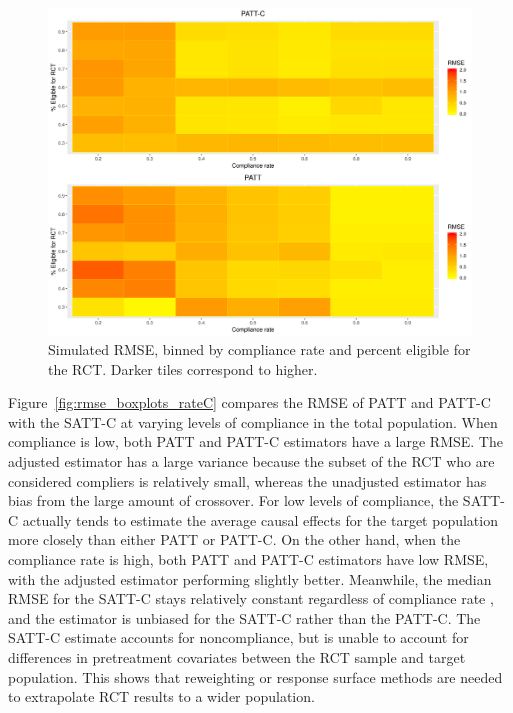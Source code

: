 \documentclass[hidelinks,12pt]{article}
\begin{document}
{\begin{figure}[htbp]
	\begin{center}
		\includegraphics[width = 1\textwidth]{rmse_ratec_rates}
		\caption{Simulated RMSE, binned by compliance rate and percent eligible for the RCT. Darker tiles correspond to higher.\label{fig:rmse_ratec_rates}}
	\end{center}
\end{figure}

Figure~\ref{fig:rmse_boxplots_rateC} compares the RMSE of PATT and PATT-C with the SATT-C  at varying levels of compliance in the total population. When compliance is low, both PATT and PATT-C estimators have a large RMSE. The adjusted estimator has a large variance because the subset of the RCT who are considered compliers is relatively small, whereas the unadjusted estimator has bias from the large amount of crossover. For low levels of compliance, the SATT-C actually tends to estimate the average causal effects for the target population more closely than either PATT or PATT-C. On the other hand, when the compliance rate is high, both PATT and PATT-C estimators have low RMSE, with {\color{red} the} adjusted estimator performing slightly better. Meanwhile, the median RMSE for the SATT-C stays relatively constant regardless of compliance rate {\color{red}, and} the estimator is unbiased for the SATT-C rather than the PATT-C. The SATT-C estimate accounts for noncompliance, but is unable to account for differences in pretreatment covariates between the RCT sample and target population. This shows that {\color{red}reweighting or response surface methods} are needed to extrapolate RCT results to a wider population.

}
\end{document}

